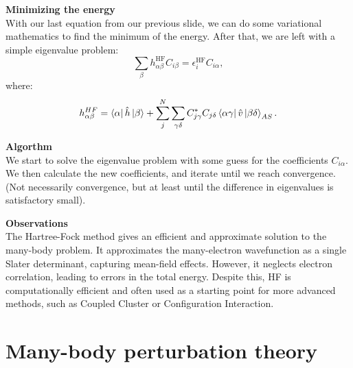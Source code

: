 \documentclass[UKenglish,aspectratio=169,12pt]{beamer}
\begin{document}
\begin{frame}
    \textbf{Minimizing the energy}\\
    With our last equation from our previous slide, we can do some variational mathematics to find the minimum of the energy. After that, we are left with a simple eigenvalue problem:
    \[
        \sum_{\beta} h^{\text{HF}}_{\alpha\beta} C_{i\beta} = \epsilon_{i}^{\text{HF}}C_{i\alpha},
    \]
    where:
    \[
        h^{HF}_{\alpha\beta} = \bra{\alpha}\hat{h}\ket{\beta} + \sum_{j}^{N}\sum_{\gamma\delta} C^{*}_{j\gamma}C_{j\delta} \bra{\alpha\gamma}\hat{v}\ket{\beta\delta}_{AS}.
    \]
  
\end{frame}

\begin{frame}
    \textbf{Algorthm}\\
    We start to solve the eigenvalue problem with some guess for the coefficients $C_{i\alpha}$. We then calculate the new coefficients, and iterate until we reach convergence. (Not necessarily convergence, but at least until the difference in eigenvalues is satisfactory small).
  
\end{frame}

\begin{frame}
    \textbf{Observations}\\
    The Hartree-Fock method gives an efficient and approximate solution to the many-body problem. It approximates the many-electron wavefunction as a single Slater determinant, capturing mean-field effects. However, it neglects electron correlation, leading to errors in the total energy. Despite this, HF is computationally efficient and often used as a starting point for more advanced methods, such as Coupled Cluster or Configuration Interaction.
\end{frame}

\section{Many-body perturbation theory}
\end{document}

